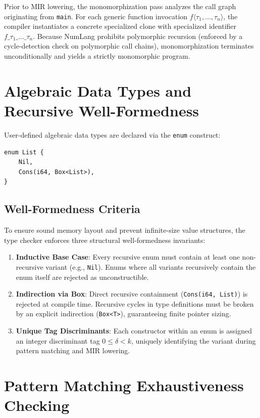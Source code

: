 Prior to MIR lowering, the monomorphization pass analyzes the call graph originating from \texttt{main}. For each generic function invocation $f\langle \tau_1, \dots, \tau_n \rangle$, the compiler instantiates a concrete specialized clone with specialized identifier $f\_\tau_1\_\dots\_\tau_n$. Because NumLang prohibits polymorphic recursion (enforced by a cycle-detection check on polymorphic call chains), monomorphization terminates unconditionally and yields a strictly monomorphic program.

\section{Algebraic Data Types and Recursive Well-Formedness}
\label{sec:types:adts}

User-defined algebraic data types are declared via the \texttt{enum} construct:
\begin{lstlisting}[language=NumLang]
enum List {
    Nil,
    Cons(i64, Box<List>),
}
\end{lstlisting}

\subsection{Well-Formedness Criteria}
To ensure sound memory layout and prevent infinite-size value structures, the type checker enforces three structural well-formedness invariants:
\begin{enumerate}
    \item \textbf{Inductive Base Case}: Every recursive enum must contain at least one non-recursive variant (e.g., \texttt{Nil}). Enums where all variants recursively contain the enum itself are rejected as unconstructible.
    \item \textbf{Indirection via Box}: Direct recursive containment (\texttt{Cons(i64, List)}) is rejected at compile time. Recursive cycles in type definitions must be broken by an explicit indirection (\texttt{Box<T>}), guaranteeing finite pointer sizing.
    \item \textbf{Unique Tag Discriminants}: Each constructor within an enum is assigned an integer discriminant tag $0 \le \delta < k$, uniquely identifying the variant during pattern matching and MIR lowering.
\end{enumerate}

\section{Pattern Matching Exhaustiveness Checking}
\label{sec:types:exhaustiveness}

